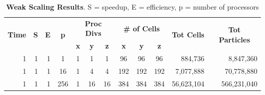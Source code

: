 \documentclass[]{article}
\begin{document}
\begin{table}[h!]
\centering
\begin{tabular}{|r|r|r|c|c|c|c|c|c|c|r|r|}
\hline
\multicolumn{1}{|c|}{\multirow{2}{*}{\textbf{Time}}} & \multicolumn{1}{l|}{\multirow{2}{*}{\textbf{S}}} & \multicolumn{1}{l|}{\multirow{2}{*}{\textbf{E}}} & \multirow{2}{*}{\textbf{p}} & \multicolumn{3}{c|}{\textbf{Proc Divs}} & \multicolumn{3}{c|}{\textbf{\# of Cells}} & \multicolumn{1}{c|}{\multirow{2}{*}{\textbf{Tot Cells}}} & \multicolumn{1}{c|}{\multirow{2}{*}{\textbf{Tot Particles}}} \\ \cline{5-10}
\multicolumn{1}{|c|}{}                               & \multicolumn{1}{l|}{}                            & \multicolumn{1}{l|}{}                            &                             & \textbf{x}  & \textbf{y}  & \textbf{z}  & \textbf{x}   & \textbf{y}   & \textbf{z}  & \multicolumn{1}{c|}{}                                    & \multicolumn{1}{c|}{}                                        \\ \hline
1                                                    & 1                                                & 1                                                & 1                           & 1           & 1           & 1           & 96           & 96           & 96          & 884,736                                                  & 8,847,360                                                    \\ \hline
1                                                    & 1                                                & 1                                                & 16                          & 1           & 4           & 4           & 192          & 192          & 192         & 7,077,888                                                & 70,778,880                                                   \\ \hline
1                                                    & 1                                                & 1                                                & 256                         & 1           & 16          & 16          & 384          & 384          & 384         & 56,623,104                                               & 566,231,040                                                  \\ \hline
\end{tabular}
\caption{\textbf{Weak Scaling Results}. S = speedup, E = efficiency, p = number of processors}
\end{table}
\end{document}
